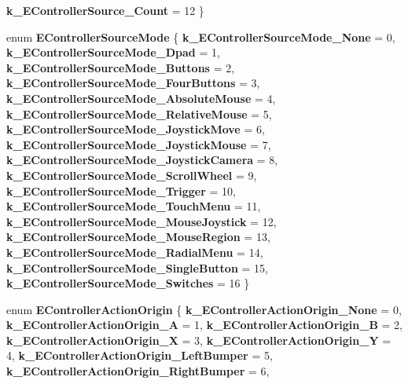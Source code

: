 \begin{DoxyCompactItemize}
{\bfseries k\+\_\+\+E\+Controller\+Source\+\_\+\+Count} = 12
 \}
\item 
\mbox{\label{namespace_valve_1_1_steamworks_a17208f35a471848415cf276b1a48f933}} 
enum {\bfseries E\+Controller\+Source\+Mode} \{ \newline
{\bfseries k\+\_\+\+E\+Controller\+Source\+Mode\+\_\+\+None} = 0, 
{\bfseries k\+\_\+\+E\+Controller\+Source\+Mode\+\_\+\+Dpad} = 1, 
{\bfseries k\+\_\+\+E\+Controller\+Source\+Mode\+\_\+\+Buttons} = 2, 
{\bfseries k\+\_\+\+E\+Controller\+Source\+Mode\+\_\+\+Four\+Buttons} = 3, 
\newline
{\bfseries k\+\_\+\+E\+Controller\+Source\+Mode\+\_\+\+Absolute\+Mouse} = 4, 
{\bfseries k\+\_\+\+E\+Controller\+Source\+Mode\+\_\+\+Relative\+Mouse} = 5, 
{\bfseries k\+\_\+\+E\+Controller\+Source\+Mode\+\_\+\+Joystick\+Move} = 6, 
{\bfseries k\+\_\+\+E\+Controller\+Source\+Mode\+\_\+\+Joystick\+Mouse} = 7, 
\newline
{\bfseries k\+\_\+\+E\+Controller\+Source\+Mode\+\_\+\+Joystick\+Camera} = 8, 
{\bfseries k\+\_\+\+E\+Controller\+Source\+Mode\+\_\+\+Scroll\+Wheel} = 9, 
{\bfseries k\+\_\+\+E\+Controller\+Source\+Mode\+\_\+\+Trigger} = 10, 
{\bfseries k\+\_\+\+E\+Controller\+Source\+Mode\+\_\+\+Touch\+Menu} = 11, 
\newline
{\bfseries k\+\_\+\+E\+Controller\+Source\+Mode\+\_\+\+Mouse\+Joystick} = 12, 
{\bfseries k\+\_\+\+E\+Controller\+Source\+Mode\+\_\+\+Mouse\+Region} = 13, 
{\bfseries k\+\_\+\+E\+Controller\+Source\+Mode\+\_\+\+Radial\+Menu} = 14, 
{\bfseries k\+\_\+\+E\+Controller\+Source\+Mode\+\_\+\+Single\+Button} = 15, 
\newline
{\bfseries k\+\_\+\+E\+Controller\+Source\+Mode\+\_\+\+Switches} = 16
 \}
\item 
\mbox{\label{namespace_valve_1_1_steamworks_a6fc78dbb8ffc7b2562e5074727868ec2}} 
enum {\bfseries E\+Controller\+Action\+Origin} \{ \newline
{\bfseries k\+\_\+\+E\+Controller\+Action\+Origin\+\_\+\+None} = 0, 
{\bfseries k\+\_\+\+E\+Controller\+Action\+Origin\+\_\+A} = 1, 
{\bfseries k\+\_\+\+E\+Controller\+Action\+Origin\+\_\+B} = 2, 
{\bfseries k\+\_\+\+E\+Controller\+Action\+Origin\+\_\+X} = 3, 
\newline
{\bfseries k\+\_\+\+E\+Controller\+Action\+Origin\+\_\+Y} = 4, 
{\bfseries k\+\_\+\+E\+Controller\+Action\+Origin\+\_\+\+Left\+Bumper} = 5, 
{\bfseries k\+\_\+\+E\+Controller\+Action\+Origin\+\_\+\+Right\+Bumper} = 6, 

\end{DoxyCompactItemize}
